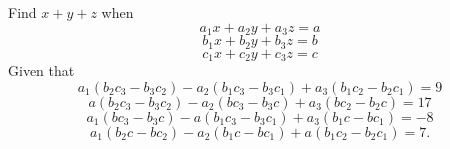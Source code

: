 Find $x+y+z$ when $$a_1x+a_2y+a_3z= a$$$$b_1x+b_2y+b_3z=b$$$$c_1x+c_2y+c_3z=c$$ Given that $$a_1\left(b_2c_3-b_3c_2\right)-a_2\left(b_1c_3-b_3c_1\right)+a_3\left(b_1c_2-b_2c_1\right)=9$$$$a\left(b_2c_3-b_3c_2\right)-a_2\left(bc_3-b_3c\right)+a_3\left(bc_2-b_2c\right)=17$$$$a_1\left(bc_3-b_3c\right)-a\left(b_1c_3-b_3c_1\right)+a_3\left(b_1c-bc_1\right)=-8$$$$a_1\left(b_2c-bc_2\right)-a_2\left(b_1c-bc_1\right)+a\left(b_1c_2-b_2c_1\right)=7.$$